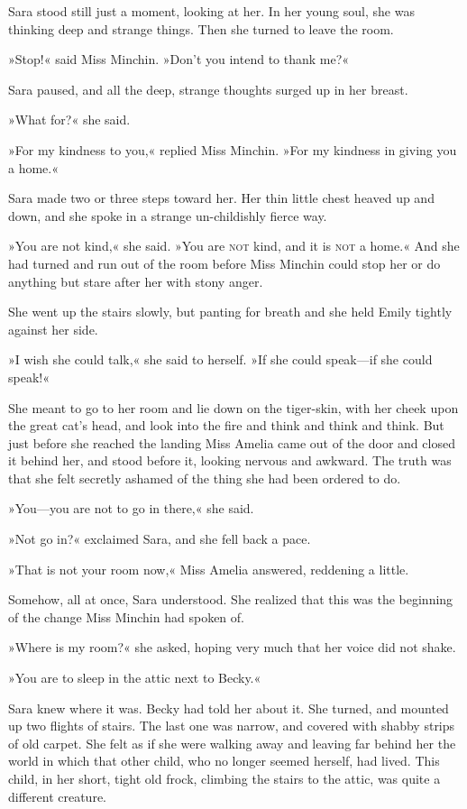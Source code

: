 Sara stood still just a moment, looking at her. In her young soul, she was thinking deep and strange things. Then she turned to leave the room.

»Stop!« said Miss Minchin. »Don't you intend to thank me?«

Sara paused, and all the deep, strange thoughts surged up in her breast.

»What for?« she said.

»For my kindness to you,« replied Miss Minchin. »For my kindness in giving you a home.«

Sara made two or three steps toward her. Her thin little chest heaved up and down, and she spoke in a strange un-childishly fierce way.

»You are not kind,« she said. »You are \textsc{not} kind, and it is \textsc{not} a home.« And she had turned and run out of the room before Miss Minchin could stop her or do anything but stare after her with stony anger.

She went up the stairs slowly, but panting for breath and she held Emily tightly against her side.

»I wish she could talk,« she said to herself. »If she could speak—if she could speak!«

She meant to go to her room and lie down on the tiger-skin, with her cheek upon the great cat's head, and look into the fire and think and think and think. But just before she reached the landing Miss Amelia came out of the door and closed it behind her, and stood before it, looking nervous and awkward. The truth was that she felt secretly ashamed of the thing she had been ordered to do.

»You—you are not to go in there,« she said.

»Not go in?« exclaimed Sara, and she fell back a pace.

»That is not your room now,« Miss Amelia answered, reddening a little.

Somehow, all at once, Sara understood. She realized that this was the beginning of the change Miss Minchin had spoken of.

»Where is my room?« she asked, hoping very much that her voice did not shake.

»You are to sleep in the attic next to Becky.«

Sara knew where it was. Becky had told her about it. She turned, and mounted up two flights of stairs. The last one was narrow, and covered with shabby strips of old carpet. She felt as if she were walking away and leaving far behind her the world in which that other child, who no longer seemed herself, had lived. This child, in her short, tight old frock, climbing the stairs to the attic, was quite a different creature.

